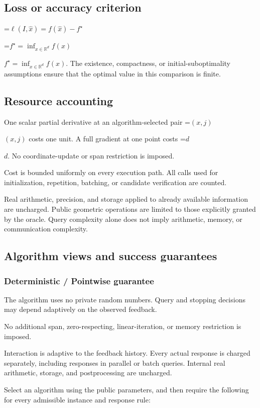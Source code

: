\documentclass[10pt,a4paper]{article}
\newcommand{\AtlasMath}[1]{\par\begingroup\centering\setbox0=\hbox{$\displaystyle #1$}\ifdim\wd0>1.4\linewidth\typeout{ATLAS WIDE FORMULA: \the\wd0}\fi\ifdim\wd0>\linewidth\resizebox{\linewidth}{!}{\box0}\else\box0\fi\par\endgroup}
\newcommand{\AtlasInlineMath}[1]{\begingroup\setbox0=\hbox{$#1$}\ifdim\wd0>.4\linewidth\endgroup\AtlasMath{#1}\else\endgroup$#1$\fi}
\begin{document}
\subsection{Loss or accuracy criterion}

\AtlasMath{\ell(I,\widehat{x})=f(\widehat{x})-f^\star}


\AtlasInlineMath{f^\star=\inf_{x\in \mathbb{R}^d}f(x)}. The existence, compactness, or initial-suboptimality assumptions ensure that the optimal value in this comparison is finite.

\subsection{Resource accounting}
One scalar partial derivative at an algorithm-selected pair \AtlasInlineMath{(x,j)} costs one unit. A full gradient at one point costs \AtlasInlineMath{d}. No coordinate-update or span restriction is imposed.

Cost is bounded uniformly on every execution path. All calls used for initialization, repetition, batching, or candidate verification are counted.

Real arithmetic, precision, and storage applied to already available information are uncharged. Public geometric operations are limited to those explicitly granted by the oracle. Query complexity alone does not imply arithmetic, memory, or communication complexity.

\subsection{Algorithm views and success guarantees}
\subsubsection{Deterministic / Pointwise guarantee}
The algorithm uses no private random numbers. Query and stopping decisions may depend adaptively on the observed feedback.

No additional span, zero-respecting, linear-iteration, or memory restriction is imposed.

Interaction is adaptive to the feedback history. Every actual response is charged separately, including responses in parallel or batch queries. Internal real arithmetic, storage, and postprocessing are uncharged.

Select an algorithm using the public parameters, and then require the following for every admissible instance and response rule:
\end{document}

